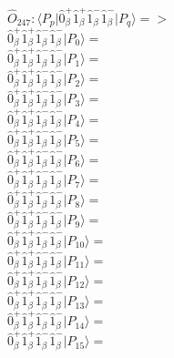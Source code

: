 \documentclass[14pt]{article}
\begin{document}
    $\hat{O}_{247}:  \langle{P_p}\vert \hat{0}_{\beta}^{+}\hat{1}_{\beta}^{+}\hat{1}_{\beta}^{-}\hat{1}_{\beta}^{-} \vert{P_q}\rangle => $ \\ 
    $ \hat{0}_{\beta}^{+}\hat{1}_{\beta}^{+}\hat{1}_{\beta}^{-}\hat{1}_{\beta}^{-} \vert{P_{0}}\rangle =  $ \\ 
    $ \hat{0}_{\beta}^{+}\hat{1}_{\beta}^{+}\hat{1}_{\beta}^{-}\hat{1}_{\beta}^{-} \vert{P_{1}}\rangle =  $ \\ 
    $ \hat{0}_{\beta}^{+}\hat{1}_{\beta}^{+}\hat{1}_{\beta}^{-}\hat{1}_{\beta}^{-} \vert{P_{2}}\rangle =  $ \\ 
    $ \hat{0}_{\beta}^{+}\hat{1}_{\beta}^{+}\hat{1}_{\beta}^{-}\hat{1}_{\beta}^{-} \vert{P_{3}}\rangle =  $ \\ 
    $ \hat{0}_{\beta}^{+}\hat{1}_{\beta}^{+}\hat{1}_{\beta}^{-}\hat{1}_{\beta}^{-} \vert{P_{4}}\rangle =  $ \\ 
    $ \hat{0}_{\beta}^{+}\hat{1}_{\beta}^{+}\hat{1}_{\beta}^{-}\hat{1}_{\beta}^{-} \vert{P_{5}}\rangle =  $ \\ 
    $ \hat{0}_{\beta}^{+}\hat{1}_{\beta}^{+}\hat{1}_{\beta}^{-}\hat{1}_{\beta}^{-} \vert{P_{6}}\rangle =  $ \\ 
    $ \hat{0}_{\beta}^{+}\hat{1}_{\beta}^{+}\hat{1}_{\beta}^{-}\hat{1}_{\beta}^{-} \vert{P_{7}}\rangle =  $ \\ 
    $ \hat{0}_{\beta}^{+}\hat{1}_{\beta}^{+}\hat{1}_{\beta}^{-}\hat{1}_{\beta}^{-} \vert{P_{8}}\rangle =  $ \\ 
    $ \hat{0}_{\beta}^{+}\hat{1}_{\beta}^{+}\hat{1}_{\beta}^{-}\hat{1}_{\beta}^{-} \vert{P_{9}}\rangle =  $ \\ 
    $ \hat{0}_{\beta}^{+}\hat{1}_{\beta}^{+}\hat{1}_{\beta}^{-}\hat{1}_{\beta}^{-} \vert{P_{10}}\rangle =  $ \\ 
    $ \hat{0}_{\beta}^{+}\hat{1}_{\beta}^{+}\hat{1}_{\beta}^{-}\hat{1}_{\beta}^{-} \vert{P_{11}}\rangle =  $ \\ 
    $ \hat{0}_{\beta}^{+}\hat{1}_{\beta}^{+}\hat{1}_{\beta}^{-}\hat{1}_{\beta}^{-} \vert{P_{12}}\rangle =  $ \\ 
    $ \hat{0}_{\beta}^{+}\hat{1}_{\beta}^{+}\hat{1}_{\beta}^{-}\hat{1}_{\beta}^{-} \vert{P_{13}}\rangle =  $ \\ 
    $ \hat{0}_{\beta}^{+}\hat{1}_{\beta}^{+}\hat{1}_{\beta}^{-}\hat{1}_{\beta}^{-} \vert{P_{14}}\rangle =  $ \\ 
    $ \hat{0}_{\beta}^{+}\hat{1}_{\beta}^{+}\hat{1}_{\beta}^{-}\hat{1}_{\beta}^{-} \vert{P_{15}}\rangle =  $ \\ 
    
\end{document}
